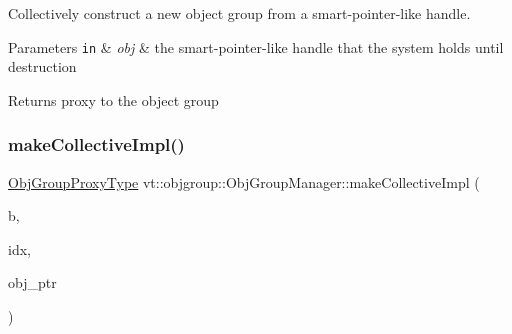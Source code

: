 Collectively construct a new object group from a smart-\/pointer-\/like handle. 


\begin{DoxyParams}[1]{Parameters}
\mbox{\tt in}  & {\em obj} & the smart-\/pointer-\/like handle that the system holds until destruction\\
\hline
\end{DoxyParams}
\begin{DoxyReturn}{Returns}
proxy to the object group 
\end{DoxyReturn}
\mbox{\label{structvt_1_1objgroup_1_1_obj_group_manager_ab9885f22f148479bb68f3a59a147cdec}} 
\subsubsection{\texorpdfstring{make\+Collective\+Impl()}{makeCollectiveImpl()}}
{\footnotesize\ttfamily \hyperlink{namespacevt_ad7cae989df485fccca57f0792a880a8e}{Obj\+Group\+Proxy\+Type} vt\+::objgroup\+::\+Obj\+Group\+Manager\+::make\+Collective\+Impl (\begin{DoxyParamCaption}\item[{\hyperlink{structvt_1_1objgroup_1_1_obj_group_manager_ac1e9bb19d4a5923dd6d595bad28f04c9}{Holder\+Base\+Ptr\+Type}}]{b,  }\item[{\hyperlink{namespacevt_1_1objgroup_a378e4b966221779c74f3a2f921eb2421}{Obj\+Type\+Idx\+Type}}]{idx,  }\item[{void $\ast$}]{obj\+\_\+ptr }\end{DoxyParamCaption})\hspace{0.3cm}{\ttfamily [private]}}

\mbox{\label{structvt_1_1objgroup_1_1_obj_group_manager_af5a05ad71853f2805cad4e08c2cedabe}} 
